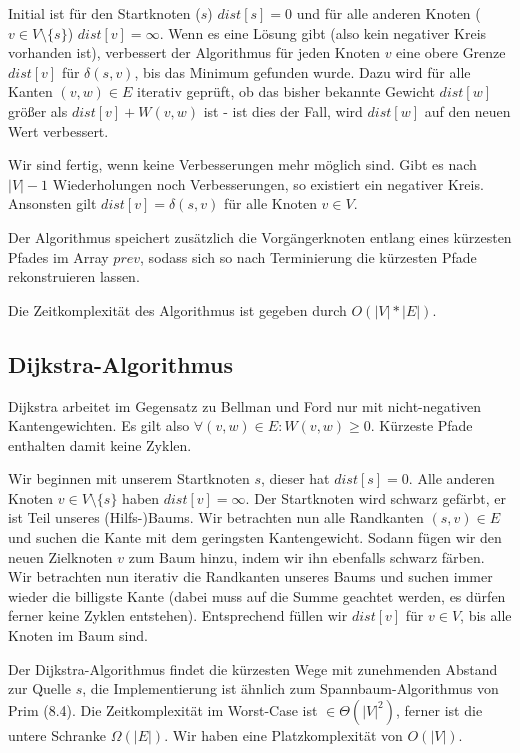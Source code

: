 \documentclass[12pt]{article}
\begin{document}
Initial ist für den Startknoten ($s$) $dist[s] = 0$ und für alle anderen Knoten ($v \in V \setminus \{s\}$) $dist[v] = \infty$. Wenn es eine Lösung gibt (also kein negativer Kreis vorhanden ist), verbessert der Algorithmus für jeden Knoten $v$ eine obere Grenze $dist[v]$ für $\delta(s, v)$, bis das Minimum gefunden wurde. Dazu wird für alle Kanten $(v, w) \in E$ iterativ geprüft, ob das bisher bekannte Gewicht $dist[w]$ größer als $dist[v] + W(v, w)$ ist - ist dies der Fall, wird $dist[w]$ auf den neuen Wert verbessert.

Wir sind fertig, wenn keine Verbesserungen mehr möglich sind. Gibt es nach $|V|-1$ Wiederholungen noch Verbesserungen, so existiert ein negativer Kreis. Ansonsten gilt $dist[v] = \delta(s, v)$ für alle Knoten $v \in V$.

Der Algorithmus speichert zusätzlich die Vorgängerknoten entlang eines kürzesten Pfades im Array $prev$, sodass sich so nach Terminierung die kürzesten Pfade rekonstruieren lassen.

Die Zeitkomplexität des Algorithmus ist gegeben durch $O(|V|*|E|)$.

\subsection{Dijkstra-Algorithmus}

Dijkstra arbeitet im Gegensatz zu Bellman und Ford nur mit nicht-negativen Kantengewichten. Es gilt also $\forall (v, w) \in E : W(v, w) \geq 0$. Kürzeste Pfade enthalten damit keine Zyklen.

Wir beginnen mit unserem Startknoten $s$, dieser hat $dist[s] = 0$. Alle anderen Knoten $v \in V \setminus \{s\}$ haben $dist[v] = \infty$. Der Startknoten wird schwarz gefärbt, er ist Teil unseres (Hilfs-)Baums. Wir betrachten nun alle Randkanten $(s, v) \in E$ und suchen die Kante mit dem geringsten Kantengewicht. Sodann fügen wir den neuen Zielknoten $v$ zum Baum hinzu, indem wir ihn ebenfalls schwarz färben. Wir betrachten nun iterativ die Randkanten unseres Baums und suchen immer wieder die billigste Kante (dabei muss auf die Summe geachtet werden, es dürfen ferner keine Zyklen entstehen). Entsprechend füllen wir $dist[v]$ für $v \in V$, bis alle Knoten im Baum sind.

Der Dijkstra-Algorithmus findet die kürzesten Wege mit zunehmenden Abstand zur Quelle $s$, die Implementierung ist ähnlich zum Spannbaum-Algorithmus von Prim (8.4). Die Zeitkomplexität im Worst-Case ist $\in \Theta(|V|^2)$, ferner ist die untere Schranke $\Omega(|E|)$. Wir haben eine Platzkomplexität von $O(|V|)$.
\end{document}
